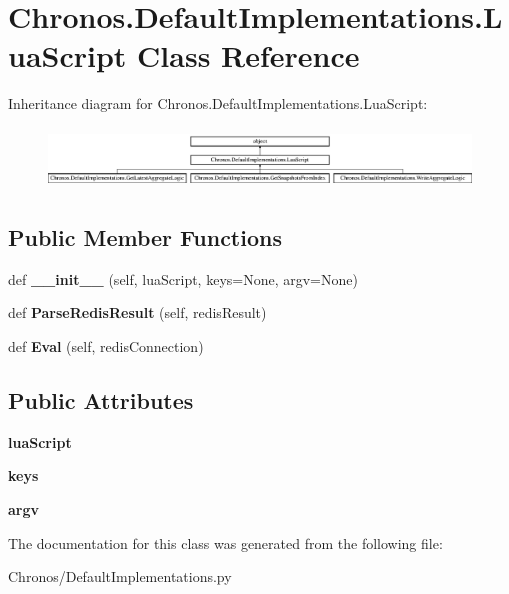 \hypertarget{classChronos_1_1DefaultImplementations_1_1LuaScript}{}\section{Chronos.\+Default\+Implementations.\+Lua\+Script Class Reference}
\label{classChronos_1_1DefaultImplementations_1_1LuaScript}
Inheritance diagram for Chronos.\+Default\+Implementations.\+Lua\+Script\+:\begin{figure}[H]
\begin{center}
\leavevmode
\includegraphics[height=1.618497cm]{classChronos_1_1DefaultImplementations_1_1LuaScript}
\end{center}
\end{figure}
\subsection*{Public Member Functions}
\begin{DoxyCompactItemize}
\item 
def {\bfseries \+\_\+\+\_\+init\+\_\+\+\_\+} (self, lua\+Script, keys=None, argv=None)
\item 
def {\bfseries Parse\+Redis\+Result} (self, redis\+Result)
\item 
def {\bfseries Eval} (self, redis\+Connection)
\end{DoxyCompactItemize}
\subsection*{Public Attributes}
\begin{DoxyCompactItemize}
\item 
{\bfseries lua\+Script}
\item 
{\bfseries keys}
\item 
{\bfseries argv}
\end{DoxyCompactItemize}


The documentation for this class was generated from the following file\+:\begin{DoxyCompactItemize}
\item 
Chronos/Default\+Implementations.\+py\end{DoxyCompactItemize}

